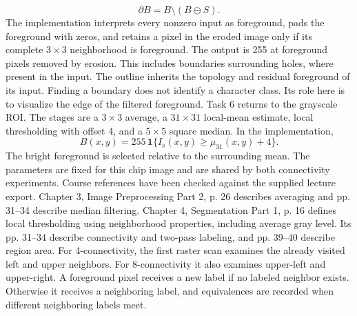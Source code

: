 \[
\partial B=B\setminus(B\ominus S).
\]
The implementation interprets every nonzero input as foreground, pads the foreground with zeros, and retains a pixel in the eroded image only if its complete $3\times3$ neighborhood is foreground. The output is 255 at foreground pixels removed by erosion. This includes boundaries surrounding holes, where present in the input.
The outline inherits the topology and residual foreground of its input. Finding a boundary does not identify a character class. Its role here is to visualize the edge of the filtered foreground.
Task 6 returns to the grayscale ROI. The stages are a $3\times3$ average, a $31\times31$ local-mean estimate, local thresholding with offset 4, and a $5\times5$ square median. In the implementation,
\[
B(x,y)=255\,\mathbf{1}\{I_s(x,y)\geq\mu_{31}(x,y)+4\}.
\]
The bright foreground is selected relative to the surrounding mean. The parameters are fixed for this chip image and are shared by both connectivity experiments.
Course references have been checked against the supplied lecture export. Chapter 3, Image Preprocessing Part 2, p. 26 describes averaging and pp. 31--34 describe median filtering. Chapter 4, Segmentation Part 1, p. 16 defines local thresholding using neighborhood properties, including average gray level. Its pp. 31--34 describe connectivity and two-pass labeling, and pp. 39--40 describe region area.
For 4-connectivity, the first raster scan examines the already visited left and upper neighbors. For 8-connectivity it also examines upper-left and upper-right. A foreground pixel receives a new label if no labeled neighbor exists. Otherwise it receives a neighboring label, and equivalences are recorded when different neighboring labels meet.


